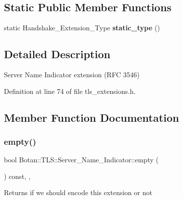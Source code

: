 \subsection*{Static Public Member Functions}
\begin{DoxyCompactItemize}
\item 
\mbox{\label{class_botan_1_1_t_l_s_1_1_server___name___indicator_a5484b9262e16114c3b7abd76ebfed58a}} 
static Handshake\+\_\+\+Extension\+\_\+\+Type {\bfseries static\+\_\+type} ()
\end{DoxyCompactItemize}


\subsection{Detailed Description}
Server Name Indicator extension (R\+FC 3546) 

Definition at line 74 of file tls\+\_\+extensions.\+h.



\subsection{Member Function Documentation}
\mbox{\label{class_botan_1_1_t_l_s_1_1_server___name___indicator_a24967daf77707733edc72619984bfb8a}} 
\subsubsection{\texorpdfstring{empty()}{empty()}}
{\footnotesize\ttfamily bool Botan\+::\+T\+L\+S\+::\+Server\+\_\+\+Name\+\_\+\+Indicator\+::empty (\begin{DoxyParamCaption}{ }\end{DoxyParamCaption}) const\hspace{0.3cm}{\ttfamily [inline]}, {\ttfamily [override]}, {\ttfamily [virtual]}}

\begin{DoxyReturn}{Returns}
if we should encode this extension or not 
\end{DoxyReturn}


